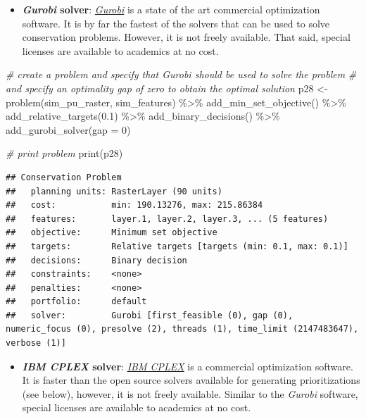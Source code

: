 \documentclass[
  12pt,
]{book}
\newenvironment{Shaded}{\begin{snugshade}}{\end{snugshade}}
\newcommand{\AttributeTok}[1]{\textcolor[rgb]{0.77,0.63,0.00}{#1}}
\newcommand{\CommentTok}[1]{\textcolor[rgb]{0.56,0.35,0.01}{\textit{#1}}}
\newcommand{\DecValTok}[1]{\textcolor[rgb]{0.00,0.00,0.81}{#1}}
\newcommand{\FloatTok}[1]{\textcolor[rgb]{0.00,0.00,0.81}{#1}}
\newcommand{\FunctionTok}[1]{\textcolor[rgb]{0.00,0.00,0.00}{#1}}
\newcommand{\NormalTok}[1]{#1}
\newcommand{\OtherTok}[1]{\textcolor[rgb]{0.56,0.35,0.01}{#1}}
\newcommand{\SpecialCharTok}[1]{\textcolor[rgb]{0.00,0.00,0.00}{#1}}
\providecommand{\tightlist}{%
  \setlength{\itemsep}{0pt}\setlength{\parskip}{0pt}}
\begin{document}
\begin{itemize}
\tightlist
\item
  \textbf{\emph{Gurobi} solver}: \href{https://www.gurobi.com/}{\emph{Gurobi}} is a state of the art commercial optimization software. It is by far the fastest of the solvers that can be used to solve conservation problems. However, it is not freely available. That said, special licenses are available to academics at no cost.
\end{itemize}

\begin{Shaded}
\begin{Highlighting}[]
\CommentTok{\# create a problem and specify that Gurobi should be used to solve the problem}
\CommentTok{\# and specify an optimality gap of zero to obtain the optimal solution}
\NormalTok{p28 }\OtherTok{\textless{}{-}} \FunctionTok{problem}\NormalTok{(sim\_pu\_raster, sim\_features) }\SpecialCharTok{\%\textgreater{}\%}
       \FunctionTok{add\_min\_set\_objective}\NormalTok{() }\SpecialCharTok{\%\textgreater{}\%}
       \FunctionTok{add\_relative\_targets}\NormalTok{(}\FloatTok{0.1}\NormalTok{) }\SpecialCharTok{\%\textgreater{}\%}
       \FunctionTok{add\_binary\_decisions}\NormalTok{() }\SpecialCharTok{\%\textgreater{}\%}
       \FunctionTok{add\_gurobi\_solver}\NormalTok{(}\AttributeTok{gap =} \DecValTok{0}\NormalTok{)}

\CommentTok{\# print problem}
\FunctionTok{print}\NormalTok{(p28)}
\end{Highlighting}
\end{Shaded}

\begin{verbatim}
## Conservation Problem
##   planning units: RasterLayer (90 units)
##   cost:           min: 190.13276, max: 215.86384
##   features:       layer.1, layer.2, layer.3, ... (5 features)
##   objective:      Minimum set objective 
##   targets:        Relative targets [targets (min: 0.1, max: 0.1)]
##   decisions:      Binary decision 
##   constraints:    <none>
##   penalties:      <none>
##   portfolio:      default
##   solver:         Gurobi [first_feasible (0), gap (0), numeric_focus (0), presolve (2), threads (1), time_limit (2147483647), verbose (1)]
\end{verbatim}

\begin{itemize}
\tightlist
\item
  \textbf{\emph{IBM CPLEX} solver}: \href{https://www.ibm.com/analytics/cplex-optimizer}{\emph{IBM CPLEX}} is a commercial optimization software. It is faster than the open source solvers available for generating prioritizations (see below), however, it is not freely available. Similar to the \emph{Gurobi} software, special licenses are available to academics at no cost.
\end{itemize}
\end{document}
